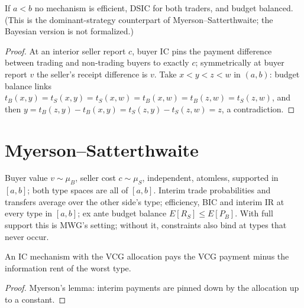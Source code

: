 \begin{theorem}
\label{thm:bilateral-trade}
\leanok
{}
If $a < b$ no mechanism is efficient, DSIC for both traders, and budget balanced. (This is the
dominant-strategy counterpart of Myerson--Satterthwaite; the Bayesian version is not formalized.)
\end{theorem}
\begin{proof}
\leanok
At an interior seller report $c$, buyer IC pins the payment difference between trading and non-trading buyers
to exactly $c$; symmetrically at buyer report $v$ the seller's receipt difference is $v$. Take $x<y<z<w$ in $(a,b)$:
budget balance links $t_B(x,y) = t_S(x,y) = t_S(x,w) = t_B(x,w) = t_B(z,w) = t_S(z,w)$, and then
$y = t_B(z,y) - t_B(x,y) = t_S(z,y) - t_S(z,w) = z$, a contradiction.
\end{proof}

\section{Myerson--Satterthwaite}

\begin{definition}
\label{def:ms}
\leanok
Buyer value $v \sim \mu_B$, seller cost $c \sim \mu_S$, independent, atomless, supported in $[a,b]$; both type
spaces are all of $[a,b]$. Interim trade probabilities and transfers average over the other side's type; efficiency,
BIC and interim IR at every type in $[a,b]$; ex ante budget balance $E[R_S] \le E[P_B]$. With full support this is
MWG's setting; without it, constraints also bind at types that never occur.
\end{definition}

\begin{lemma}
\label{lem:ms-vcg}
\leanok
{}
An IC mechanism with the VCG allocation pays the VCG payment minus the information rent of the worst type.
\end{lemma}
\begin{proof}
\leanok
Myerson's lemma: interim payments are pinned down by the allocation up to a constant.
\end{proof}

